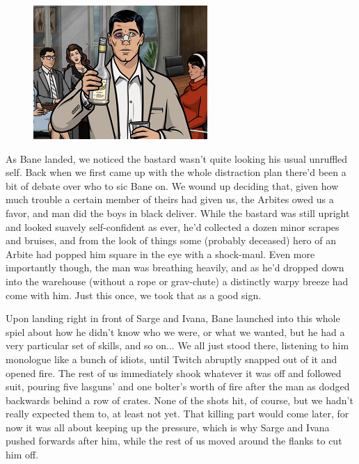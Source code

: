 \begin{figure}
	\begin{center}
		\includegraphics[width=\figwidth]{pics/19/50.png}
	\end{center}
\end{figure}
As Bane landed, we noticed the bastard wasn't quite looking his usual unruffled self. 
Back when we first came up with the whole distraction plan there'd been a bit of debate over who to sic Bane on. 
We wound up deciding that, given how much trouble a certain member of theirs had given us, the Arbites owed us a favor, and man did the boys in black deliver. 
While the bastard was still upright and looked suavely self-confident as ever, he'd collected a dozen minor scrapes and bruises, and from the look of things some (probably deceased) hero of an Arbite had popped him square in the eye with a shock-maul. 
Even more importantly though, the man was breathing heavily, and as he'd dropped down into the warehouse (without a rope or grav-chute) a distinctly warpy breeze had come with him. 
Just this once, we took that as a good sign.

Upon landing right in front of Sarge and Ivana, Bane launched into this whole spiel about how he didn't know who we were, or what we wanted, but he had a very particular set of skills, and so on... 
We all just stood there, listening to him monologue like a bunch of idiots, until Twitch abruptly snapped out of it and opened fire. 
The rest of us immediately shook whatever it was off and followed suit, pouring five lasguns' and one bolter's worth of fire after the man as dodged backwards behind a row of crates. 
None of the shots hit, of course, but we hadn't really expected them to, at least not yet. 
That killing part would come later, for now it was all about keeping up the pressure, which is why Sarge and Ivana pushed forwards after him, while the rest of us moved around the flanks to cut him off.

